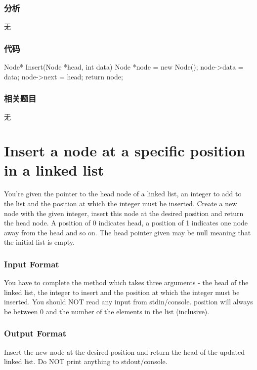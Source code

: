 \subsubsection{分析}
无


\subsubsection{代码}
\begin{Code}
Node* Insert(Node *head, int data) {
    Node *node = new Node();
    node->data = data;
    node->next = head;
    return node;
}
\end{Code}


\subsubsection{相关题目}
\begindot
\item 无
\myenddot


\section{Insert a node at a specific position in a linked list} %
\label{sec:Insert-a-node-at-a-specific-position-in-a-linked-list}

You’re given the pointer to the head node of a linked list, an integer to add to the list and the position at which the integer must be inserted. Create a new node with the given integer, insert this node at the desired position and return the head node. A position of 0 indicates head, a position of 1 indicates one node away from the head and so on. The head pointer given may be null meaning that the initial list is empty.


\subsubsection{Input Format}
You have to complete the  method which takes three arguments - the head of the linked list, the integer to insert and the position at which the integer must be inserted. You should NOT read any input from stdin/console. position will always be between 0 and the number of the elements in the list (inclusive).


\subsubsection{Output Format}
Insert the new node at the desired position and return the head of the updated linked list. Do NOT print anything to stdout/console.



